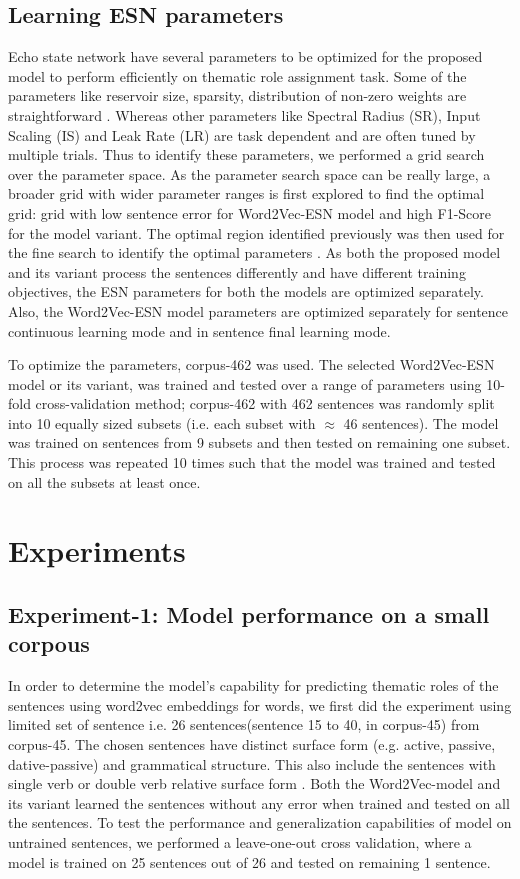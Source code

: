 \subsection{Learning ESN parameters}

Echo state network have several parameters to be optimized for the proposed model to perform efficiently on thematic role assignment task. Some of the parameters like reservoir size, sparsity, distribution of non-zero weights are straightforward \cite{esn:practical_guide}. Whereas other parameters like Spectral Radius (SR), Input Scaling (IS) and Leak Rate (LR) are task dependent and are often tuned by multiple trials. Thus to identify these parameters, we performed a grid search over the parameter space. As the parameter search space can be really large, a broader grid with wider parameter ranges is first explored to find the optimal grid: grid with low sentence error for Word2Vec-ESN model and high F1-Score for the model variant. The optimal region identified previously was then used for the fine search to identify the optimal parameters \cite{esn:practical_guide}. As both the proposed model and its variant process the sentences differently and have different training objectives, the ESN parameters for both the models are optimized separately. Also, the Word2Vec-ESN model parameters are optimized separately for sentence continuous learning mode and in sentence final learning mode.

To optimize the parameters, corpus-462 was used. The selected Word2Vec-ESN model or its variant, was trained and tested over a range of parameters using 10-fold cross-validation method; corpus-462 with 462 sentences was randomly split into 10 equally sized subsets (i.e. each subset with $\approx$ 46 sentences). The model was trained on sentences from 9 subsets and then tested on remaining one subset. This process was repeated 10 times such that the model was trained and tested on all the subsets at least once. 

\section{Experiments}

\subsection{Experiment-1: Model performance on a small corpous}

In order to determine the model's capability for predicting thematic roles of the sentences using word2vec embeddings for words, we first did the experiment using limited set of sentence i.e. 26 sentences(sentence 15 to 40, in corpus-45) from corpus-45. The chosen sentences have distinct surface form (e.g. active, passive, dative-passive) and grammatical structure. This also include the sentences with single verb or double verb relative surface form \cite{}. Both the Word2Vec-model and its variant learned the sentences without any error when trained and tested on all the sentences. To test the performance and generalization capabilities of model on untrained sentences, we performed a leave-one-out cross validation, where a model is trained on 25 sentences out of 26 and tested on remaining 1 sentence.

